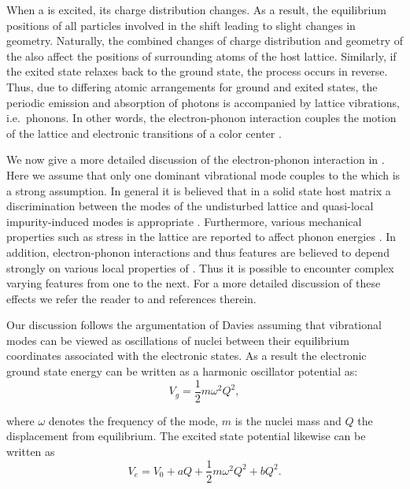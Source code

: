     When a \cc is excited, its charge distribution changes. As a result, the equilibrium positions of all particles involved in the \cc shift leading to slight changes in \cc geometry. Naturally, the combined changes of charge distribution and geometry of the \cc also affect the positions of surrounding atoms of the host lattice. Similarly, if the exited state relaxes back to the ground state, the process occurs in reverse. Thus, due to differing atomic arrangements for ground and exited states, the periodic emission and absorption of photons is accompanied by lattice vibrations, i.e.\ phonons. In other words, the electron-phonon interaction couples the motion of the lattice and electronic transitions of a color center \cite{Davies1981, Zaitsev2000}.

    We now give a more detailed discussion of the electron-phonon interaction in \sivs. Here we assume that only one dominant vibrational mode couples to the \cc which is a strong assumption. In general it is believed that in a solid state host matrix a discrimination between the modes of the undisturbed lattice and quasi-local impurity-induced modes is appropriate \cite{Zaitsev2000, Feng1993b, Solin1970}. Furthermore, various mechanical properties such as stress in the lattice are reported to affect phonon energies \cite{Grimsditch1978}. In addition, electron-phonon interactions and thus \psb features are believed to depend strongly on various local properties of \ccs \cite{Sternschulte1994, Huttner1995}. Thus it is possible to encounter complex varying \psb features from one \siv to the next. For a more detailed discussion of these effects we refer the reader to \cite{Neu2012, Riedrich-moller2014} and references therein.

    Our discussion follows the argumentation of Davies \cite{Davies1981} assuming that vibrational modes can be viewed as oscillations of nuclei between their equilibrium coordinates associated with the electronic states. As a result the electronic ground state energy can be written as a harmonic oscillator potential as:
    \begin{equation}
      V_g = \frac{1}{2} m \omega^2 Q^2 ,
    \end{equation}

    where $\omega$ denotes the frequency of the mode, $m$ is the nuclei mass and $Q$ the displacement from equilibrium. The excited state potential likewise can be written as
    \begin{equation}
      V_e = V_0 + aQ + \frac{1}{2} m \omega^2 Q^2 + bQ^2 .
    \end{equation}

